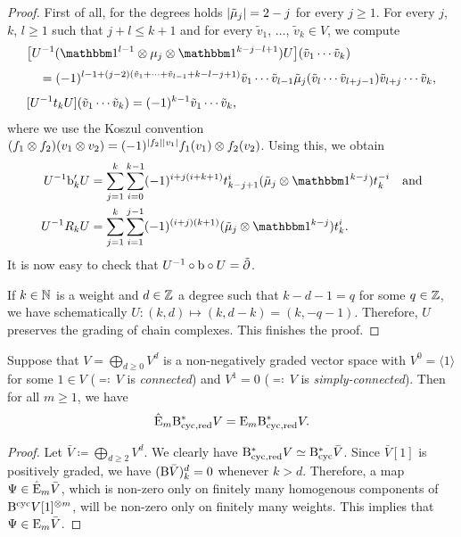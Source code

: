 \documentclass[\MainFolder/Text.tex]{subfiles}
\begin{document}
\begin{proof} 
First of all, for the degrees holds $|\tilde{\mu}_j| = 2 - j$ for every $j\ge 1$. For every $j$, $k$, $l\ge 1$ such that $j+l \le k+1$ and for every $\tilde{v}_1$, $\dotsc$, $\tilde{v}_k \in V$, we compute
$$ \begin{aligned}
&\bigl[U^{-1}(\Id^{l-1}\otimes \mu_j \otimes \Id^{k-j-l+1})U\bigr](\tilde{v}_1\dotsb \tilde{v}_k) \\[\jot] &\quad = (-1)^{l-1 + (j-2)(\tilde{v}_1 + \dotsb + \tilde{v}_{l-1} + k - l - j +1)} \tilde{v}_1\dotsb\tilde{v}_{l-1}\tilde{\mu}_j(\tilde{v}_l\dotsb \tilde{v}_{l+j-1})\tilde{v}_{l+j}\dotsb \tilde{v}_k, \\[\jot]
& [U^{-1} t_k U](\tilde{v}_1\dotsb \tilde{v}_k) = (-1)^{k-1} \tilde{v}_1 \dotsb \tilde{v}_k,
\end{aligned}$$
where we use the Koszul convention $(f_1\otimes f_2)(v_1\otimes v_2) = (-1)^{|f_2||v_1|} f_1(v_1)\otimes f_2(v_2)$. Using this, we obtain
$$\begin{aligned}
U^{-1} \Hd'_k U &= \sum_{j=1}^k \sum_{i=0}^{k-1} (-1)^{i+j(i+k+1)} t^i_{k-j+1}(\tilde{\mu}_j \otimes \Id^{k-j})t_k^{-i}\quad\text{and} \\
U^{-1} R_k U &= \sum_{j=1}^k \sum_{i=1}^{j-1} (-1)^{(i+j)(k+1)} (\tilde{\mu}_j\otimes \Id^{k-j})t_k^i.
\end{aligned}$$
It is now easy to check that $U^{-1}\circ \mathrm{b}\circ U = \tilde{\partial}$.

If $k\in \mathbb{N}$ is a weight and $d\in\mathbb{Z}$ a degree such that $k-d-1 = q$ for some $q\in \mathbb{Z}$, we have schematically $U: (k,d)\mapsto (k, d - k) = (k,-q-1)$. Therefore, $U$ preserves the grading of chain complexes. This finishes the proof.
\end{proof}



\begin{Proposition}\label{Prop:SimplCon}
Suppose that $V = \bigoplus_{d\ge 0} V^d$ is a non-negatively graded vector space with $V^0=\langle 1 \rangle$ for some $1\in V$ ($\eqqcolon$\,$V$ is \emph{connected}) and $V^1 = 0$ ($\eqqcolon$\,$V$ is \emph{simply-connected}). Then for all $m\ge 1$, we have
$$ \hat{\mathrm{E}}_m \mathrm{B}_{\mathrm{cyc},\mathrm{red}}^* V = \mathrm{E}_m \mathrm{B}_{\mathrm{cyc},\mathrm{red}}^* V. $$
\end{Proposition}
\begin{proof}
Let $\bar{V}\coloneqq \bigoplus_{d\ge 2} V^d$. We clearly have $\mathrm{B}_{\mathrm{cyc},\mathrm{red}}^* V \simeq \mathrm{B}_{\mathrm{cyc}}^* \bar{V}$. Since $\bar{V}[1]$ is positively graded, we have $(\mathrm{B} \bar{V})_{k}^d = 0$ whenever $k>d$. Therefore, a map $\Psi\in \hat{\mathrm{E}}_m \bar{V}$, which is non-zero only on finitely many homogenous components of $\mathrm{B}^{\mathrm{cyc}} V[1]^{\otimes m}$, will be non-zero only on finitely many weights. This implies that $\Psi\in \mathrm{E}_m \bar{V}$.
\end{proof}
\end{document}
